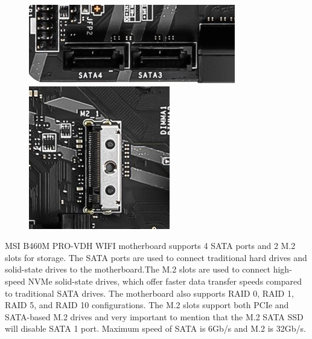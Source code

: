 \documentclass{article}
\begin{document}
\begin{figure}
	\vspace{-30pt} 
	\includegraphics[width=\linewidth]{sata.jpg}
	\smallskip
	\includegraphics[width=\linewidth]{m.2.jpg}
\end{figure}
  
MSI B460M PRO-VDH WIFI motherboard supports 4 SATA ports and 2 M.2 slots for storage.
The SATA ports are used to connect traditional hard drives and solid-state drives to
the motherboard.The M.2 slots are used to connect high-speed NVMe solid-state drives,
which offer faster data transfer speeds compared to traditional SATA drives. The 
motherboard also supports RAID 0, RAID 1, RAID 5, and RAID 10 configurations. The M.2 
slots support both PCIe and SATA-based M.2 drives and very important to mention that 
the M.2 SATA SSD will disable SATA 1 port. Maximum speed of SATA is 6Gb/s and M.2 is
32Gb/s.
\end{document}
